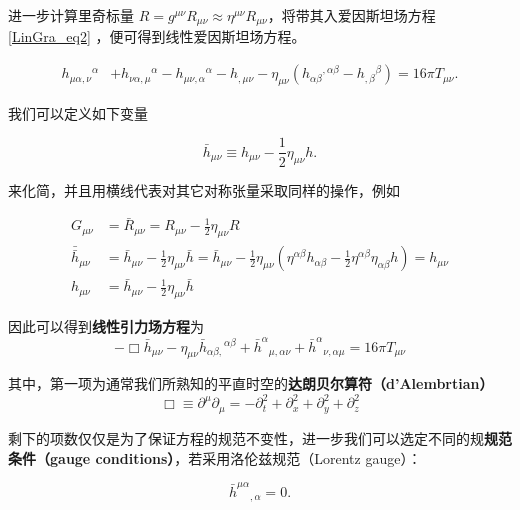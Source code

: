 进一步计算里奇标量 $R = g^{\mu\nu}R_{\mu\nu}\approx \eta^{\mu\nu}R_{\mu\nu}$，将带其入爱因斯坦场方程\autoref{LinGra_eq2}  ，便可得到线性爱因斯坦场方程。

\begin{equation}
\begin{aligned}
h_{\mu \alpha, \nu}{ }^{\alpha} &+h_{\nu \alpha, \mu}{ }^{\alpha}-h_{\mu \nu, \alpha}{ }^{\alpha}-h_{, \mu \nu} -\eta_{\mu \nu}\left(h_{\alpha \beta}{ }^{, \alpha \beta}-h_{, \beta}{ }^{\beta}\right)= 16 \pi T_{\mu \nu} .
\end{aligned}
\end{equation}

我们可以定义如下变量

\begin{equation}
\bar{h}_{\mu\nu} \equiv h_{\mu\nu} - \frac{1}{2}\eta_{\mu\nu}h.
\end{equation}

来化简，并且用横线代表对其它对称张量采取同样的操作，例如

\begin{align}
G_{\mu\nu} &= \bar{R}_{\mu\nu} = R_{\mu\nu}- \frac{1}{2}\eta_{\mu\nu}R\\
\bar{\bar{h}}_{\mu\nu} &= \bar{h}_{\mu\nu} - \frac{1}{2}\eta_{\mu\nu}\bar{h} = \bar{h}_{\mu\nu} - \frac{1}{2}\eta_{\mu\nu} (\eta^{\alpha\beta}h_{\alpha\beta}-\frac{1}{2}\eta^{\alpha\beta}\eta_{\alpha\beta}h)= h_{\mu\nu}\\
h_{\mu\nu} &= \bar{h}_{\mu\nu} - \frac{1}{2}\eta_{\mu\nu} \bar{h}
\end{align}

因此可以得到\textbf{线性引力场方程}为
\begin{equation}
-\Box{\bar{h}_{\mu \nu}}-\eta_{\mu \nu} \bar{h}_{\alpha \beta,}{ }^{\alpha \beta} + \bar{h}^{\alpha}{ }_{\mu,\alpha\nu} + \bar{h}^{\alpha}{ }_{\nu,\alpha\mu}=16 \pi T_{\mu \nu}
\end{equation}

其中，第一项为通常我们所熟知的平直时空的\textbf{达朗贝尔算符（d'Alembrtian）}
$$
\Box \equiv  \partial^\mu\partial_\mu =  - \partial_t^2 + \partial_x^2 +\partial_y^2 + \partial_z^2
$$

剩下的项数仅仅是为了保证方程的规范不变性，进一步我们可以选定不同的规\textbf{规范条件（gauge conditions）}，若采用洛伦兹规范（Lorentz gauge）：

\begin{equation}
\bar{h}^{\mu\alpha}{ }_{,\alpha}=0.
\end{equation}

